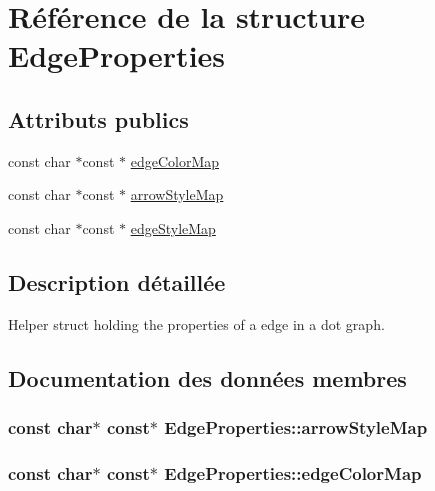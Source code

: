 \hypertarget{struct_edge_properties}{}\section{Référence de la structure Edge\+Properties}
\label{struct_edge_properties}
\subsection*{Attributs publics}
\begin{DoxyCompactItemize}
\item 
const char $\ast$const $\ast$ \hyperlink{struct_edge_properties_ad0c9d3fa5e49b41e92ff95cbf188a5b1}{edge\+Color\+Map}
\item 
const char $\ast$const $\ast$ \hyperlink{struct_edge_properties_a2b2315fe38a4822f4e657c71236fb027}{arrow\+Style\+Map}
\item 
const char $\ast$const $\ast$ \hyperlink{struct_edge_properties_a7938928bf27311c0e4acf2c40e0f0510}{edge\+Style\+Map}
\end{DoxyCompactItemize}


\subsection{Description détaillée}
Helper struct holding the properties of a edge in a dot graph. 

\subsection{Documentation des données membres}
\hypertarget{struct_edge_properties_a2b2315fe38a4822f4e657c71236fb027}{}
\subsubsection[{arrow\+Style\+Map}]{\setlength{\rightskip}{0pt plus 5cm}const char$\ast$ const$\ast$ Edge\+Properties\+::arrow\+Style\+Map}\label{struct_edge_properties_a2b2315fe38a4822f4e657c71236fb027}
\hypertarget{struct_edge_properties_ad0c9d3fa5e49b41e92ff95cbf188a5b1}{}
\subsubsection[{edge\+Color\+Map}]{\setlength{\rightskip}{0pt plus 5cm}const char$\ast$ const$\ast$ Edge\+Properties\+::edge\+Color\+Map}\label{struct_edge_properties_ad0c9d3fa5e49b41e92ff95cbf188a5b1}
\hypertarget{struct_edge_properties_a7938928bf27311c0e4acf2c40e0f0510}{}
